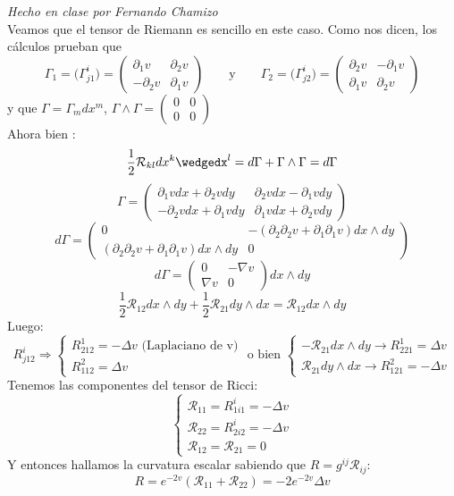 \begin{problem}[10]
	\solution\textit{Hecho en clase por Fernando Chamizo}\\ Veamos que el tensor de Riemann es sencillo en este caso. Como nos dicen, los cálculos prueban que \[
	\Gamma_1=\big(\Gamma_{j1}^i\big)=
	\begin{pmatrix}
	\partial_1 v & \partial_2v
	\\
	-\partial_2 v & \partial_1v
	\end{pmatrix}
	\qquad\text{y}\qquad
	\Gamma_2=\big(\Gamma_{j2}^i\big)=
	\begin{pmatrix}
	\partial_2 v & -\partial_1v
	\\
	\partial_1 v & \partial_2v
	\end{pmatrix}
	\]
	y que $\Gamma=\Gamma_mdx^m$, $\Gamma\wedge\Gamma=\begin{pmatrix}
	0 & 0
	\\
	0 & 0
	\end{pmatrix}$\\
	Ahora bien : $$\frac{1}{2}\mathcal{R}_{kl}dx^k\wedgedx^l=d\Gamma+\Gamma\wedge\Gamma=d\Gamma$$
	$$\Gamma=\begin{pmatrix}
	\partial_1 vdx+ \partial_2 vdy & \partial_2 vdx-\partial_1 v dy\\
	-\partial_2 vdx+\partial_1 v dy& \partial_1 vdx+ \partial_2 vdy
	\end{pmatrix}$$
	$$d\Gamma=\begin{pmatrix}
	0 &-( \partial_2\partial_2 v +\partial_1\partial_1 v)dx\wedge dy\\
	( \partial_2\partial_2 v +\partial_1\partial_1 v)dx\wedge dy& 0
	\end{pmatrix}$$
	$$d\Gamma=\begin{pmatrix}
	0 &-\nabla v\\
	\nabla v& 0
	\end{pmatrix}dx\wedge dy$$
	$$\frac{1}{2}\mathcal{R}_{12}dx\wedge dy + \frac{1}{2}\mathcal{R}_{21}dy\wedge dx=\mathcal{R}_{12}dx\wedge dy$$
	Luego: $$R^i_{j12}\Rightarrow\begin{cases}
	R^1_{212}=-\Delta v \text{ (Laplaciano de v)}\\
	R^2_{112}=\Delta v
	\end{cases}\text{ o bien }\begin{cases}
	-\mathcal{R}_{21}dx\wedge dy \rightarrow R^1_{221}=\Delta v\\
	\mathcal{R}_{21}dy\wedge dx \rightarrow R^2_{121}=-\Delta v
	\end{cases}$$ Tenemos las componentes del tensor de Ricci: $$\begin{cases}
	\mathcal{R}_{11}=R^i_{1i1}=-\Delta v\\
	\mathcal{R}_{22}=R^i_{2i2}=-\Delta v\\
	\mathcal{R}_{12}=\mathcal{R}_{21}=0
	\end{cases}$$
	Y entonces hallamos la curvatura escalar sabiendo que $R=g^{ij}\mathcal{R}_{ij}$:
	$$R=e^{-2v}\left(\mathcal{R}_{11}+\mathcal{R}_{22}\right)=-2e^{-2v}\Delta v$$
	
\end{problem}